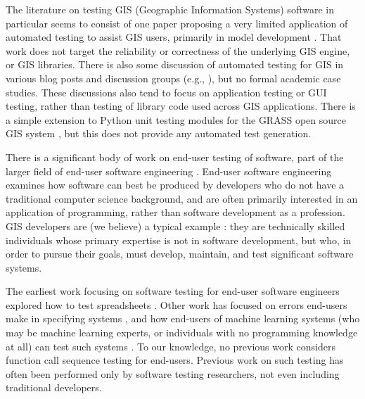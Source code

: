The literature on testing GIS (Geographic Information Systems) software
in particular seems to consist of one paper proposing a very limited
application of automated testing to assist GIS users, primarily in
model development \cite{GISTest}.  That work does not target the
reliability or correctness of the underlying GIS engine, or GIS
libraries.  There is also some discussion of automated testing for GIS
in various blog posts and discussion groups (e.g.,
\cite{gisblog1,gisblog2}), but no formal academic case studies.  These
discussions also tend to focus on application testing or GUI testing,
rather than testing of library code used across GIS applications.
There is a simple extension to Python unit testing modules for the
GRASS open source GIS system \cite{GRASSunit}, but this does not
provide any automated test generation.

There is a significant body of work on end-user testing of software,
part of the larger field of end-user software engineering
\cite{burnettEUSE,Silos}.  End-user software engineering examines how
software can best be produced by developers who do not have a
traditional computer science background, and are often primarily
interested in an application of programming, rather than software
development as a profession.  GIS developers are (we believe) a
typical example \cite{Segal07}:  they are technically skilled  individuals whose
primary expertise is not in software development, but who, in order to
pursue their goals, must develop, maintain, and test significant
software systems.

The earliest work focusing on software testing for
end-user software engineers explored how to test spreadsheets
\cite{rothermelTOSEM,rothermel2000wysiwyt}.  Other work has focused on
errors end-users make in specifying systems \cite{Phalgune}, and how
end-users of machine learning systems (who may be machine learning
experts, or individuals with no programming knowledge at all) can test
such systems \cite{OnlyOracle,kulesza-eud11,shinsel-vlhcc}.  To our
knowledge, no previous work considers function call sequence testing for
end-users.  Previous work on such testing has often been performed
only by software testing researchers, not even including traditional developers.

